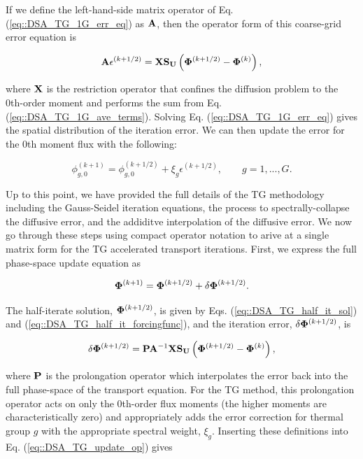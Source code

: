 \noindent If we define the left-hand-side matrix operator of Eq. (\ref{eq::DSA_TG_1G_err_eq}) as ${\bf A}$, then the operator form of this coarse-grid error equation is 

\begin{equation}
\label{eq::DSA_TG_1G_err_eq_op}
{\bf A} \epsilon^{(k+1/2)}  =  {\bf X} {\bf S_{U}} \left(  {\bf \Phi}^{(k+1/2)} - {\bf \Phi}^{(k)}  \right),
\end{equation}

\noindent where ${\bf X}$ is the restriction operator that confines the diffusion problem to the 0th-order moment and performs the sum from Eq. (\ref{eq::DSA_TG_1G_ave_terms}). Solving Eq. (\ref{eq::DSA_TG_1G_err_eq}) gives the spatial distribution of the iteration error. We can then update the error for the 0th moment flux with the following:

\begin{equation}
\label{eq::DSA_TG_err_update}
 \phi_{g,0}^{(k+1)} =  \phi_{g,0}^{(k+1/2)}  + \xi_g \epsilon^{(k+1/2)}, \qquad g=1,...,G .
\end{equation}

Up to this point, we have provided the full details of the TG methodology including the Gauss-Seidel iteration equations, the process to spectrally-collapse the diffusive error, and the addiditve interpolation of the diffusive error. We now go through these steps using compact operator notation to arive at a single matrix form for the TG accelerated transport iterations. First, we express the full phase-space update equation as 

\begin{equation}
\label{eq::DSA_TG_update_op}
 {\bf \Phi}^{(k+1)} =  {\bf \Phi}^{(k+1/2)}  + \delta {\bf \Phi}^{(k+1/2)} .
\end{equation}

\noindent The half-iterate solution, ${\bf \Phi}^{(k+1/2)}$, is given by Eqs. (\ref{eq::DSA_TG_half_it_sol}) and (\ref{eq::DSA_TG_half_it_forcingfunc}), and the iteration error, $\delta {\bf \Phi}^{(k+1/2)}$, is 

\begin{equation}
\label{eq::DSA_TG_proj_err}
\delta {\bf \Phi}^{(k+1/2)} =  {\bf P} {\bf A}^{-1}  {\bf X} {\bf S_{U}} \left(  {\bf \Phi}^{(k+1/2)} - {\bf \Phi}^{(k)}  \right),
\end{equation}

\noindent where ${\bf P}$ is the prolongation operator which interpolates the error back into the full phase-space of the transport equation. For the TG method, this prolongation operator acts on only the 0th-order flux moments (the higher moments are characteristically zero) and appropriately adds the error correction for thermal group $g$ with the appropriate spectral weight, $\xi_g$. Inserting these definitions into Eq. (\ref{eq::DSA_TG_update_op}) gives


